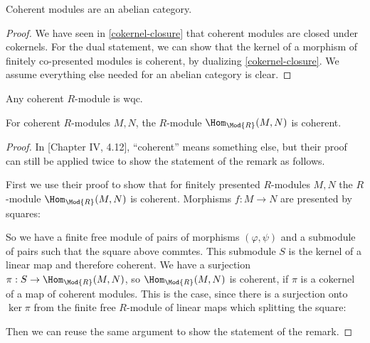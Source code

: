 \begin{theorem}
  Coherent modules are an abelian category.
\end{theorem}

\begin{proof}
  We have seen in \cref{cokernel-closure} that coherent modules are closed under cokernels.
  For the dual statement, we can show that the kernel of a morphism of finitely co-presented modules
  is coherent, by dualizing \cref{cokernel-closure}.
  We assume everything else needed for an abelian category is clear.
\end{proof}

\begin{remark}
  Any coherent $R$-module is wqc.
\end{remark}

\begin{remark}
\label{hom-closure}
  For coherent $R$-modules $M,N$, the $R$-module $\Hom_{\Mod{R}}(M,N)$ is coherent.
\end{remark}

\begin{proof}
  In \cite{lombardi-quitte}[Chapter IV, 4.12], ``coherent'' means something else, but their proof can still be applied twice to show the statement of the remark as follows.
  
  First we use their proof to show that for finitely presented $R$-modules $M,N$ the $R$-module $\Hom_{\Mod{R}}(M,N)$ is coherent. Morphisms $f:M\to N$ are presented by squares:
  \begin{center}
\end{center}
  So we have a finite free module of pairs of morphisms $(\varphi,\psi)$ and a submodule of pairs such that the square above commtes.
  This submodule $S$ is the kernel of a linear map and therefore coherent.
  We have a surjection $\pi:S\to \Hom_{\Mod{R}}(M,N)$, so $\Hom_{\Mod{R}}(M,N)$ is coherent,
  if $\pi$ is a cokernel of a map of coherent modules.
  This is the case, since there is a surjection onto $\ker{\pi}$ from the finite free $R$-module of linear maps which splitting the square:
  \begin{center}
\end{center}

  Then we can reuse the same argument to show the statement of the remark.
\end{proof}

